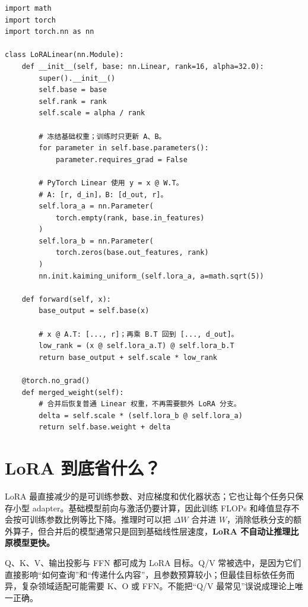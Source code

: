 \begin{lstlisting}
import math
import torch
import torch.nn as nn

class LoRALinear(nn.Module):
    def __init__(self, base: nn.Linear, rank=16, alpha=32.0):
        super().__init__()
        self.base = base
        self.rank = rank
        self.scale = alpha / rank

        # 冻结基础权重；训练时只更新 A、B。
        for parameter in self.base.parameters():
            parameter.requires_grad = False

        # PyTorch Linear 使用 y = x @ W.T。
        # A: [r, d_in]，B: [d_out, r]。
        self.lora_a = nn.Parameter(
            torch.empty(rank, base.in_features)
        )
        self.lora_b = nn.Parameter(
            torch.zeros(base.out_features, rank)
        )
        nn.init.kaiming_uniform_(self.lora_a, a=math.sqrt(5))

    def forward(self, x):
        base_output = self.base(x)

        # x @ A.T: [..., r]；再乘 B.T 回到 [..., d_out]。
        low_rank = (x @ self.lora_a.T) @ self.lora_b.T
        return base_output + self.scale * low_rank

    @torch.no_grad()
    def merged_weight(self):
        # 合并后恢复普通 Linear 权重，不再需要额外 LoRA 分支。
        delta = self.scale * (self.lora_b @ self.lora_a)
        return self.base.weight + delta
\end{lstlisting}

\section{LoRA 到底省什么？}

LoRA 最直接减少的是可训练参数、对应梯度和优化器状态；它也让每个任务只保存小型 adapter。基础模型前向与激活仍要计算，因此训练 FLOPs 和峰值显存不会按可训练参数比例等比下降。推理时可以把 $\Delta W$ 合并进 $W$，消除低秩分支的额外算子，但合并后的模型通常只是回到基础线性层速度，\textbf{LoRA 不自动让推理比原模型更快。}

Q、K、V、输出投影与 FFN 都可成为 LoRA 目标。Q/V 常被选中，是因为它们直接影响“如何查询”和“传递什么内容”，且参数预算较小；但最佳目标依任务而异，复杂领域适配可能需要 K、O 或 FFN。不能把“Q/V 最常见”误说成理论上唯一正确。

